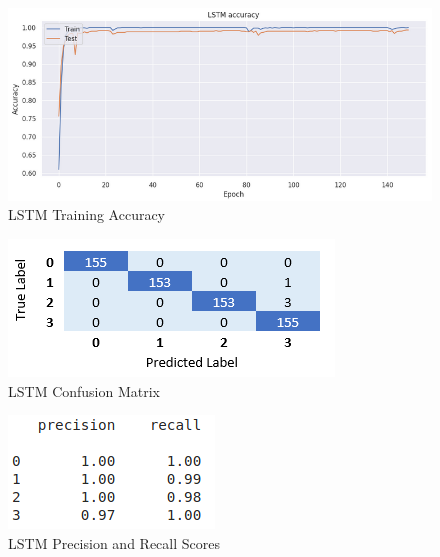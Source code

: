 \documentclass{article}
\begin{document}
\begin{figure}[!htb]
\caption{LSTM Training Accuracy}
\centering
\includegraphics[scale=0.5]{Images/LSTM_train_accuracy.png}
\end{figure}

\begin{figure}[!htb]
\caption{LSTM Confusion Matrix}
\centering
\includegraphics[scale=0.5]{Images/LSTM_confusion_matrix.png}
\end{figure}

\begin{figure}[!htb]
\caption{LSTM Precision and Recall Scores}
\centering
\includegraphics[scale=0.5]{Images/LSTM_prec_rec.png}
\end{figure}
\end{document}
